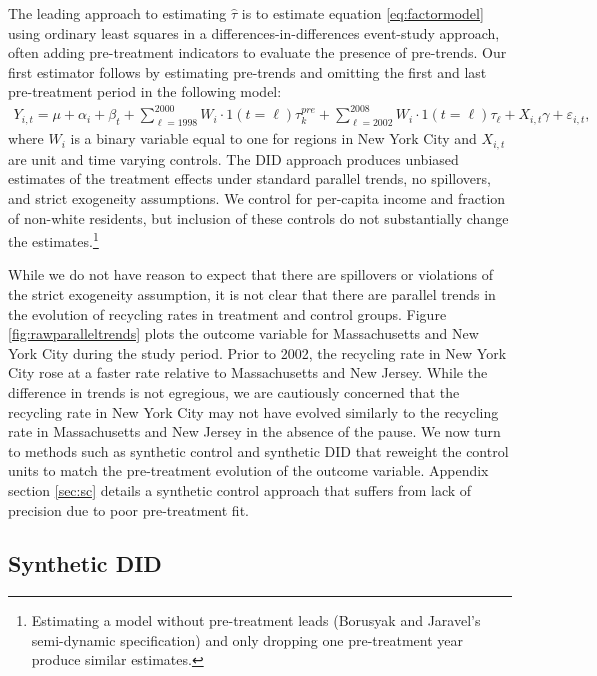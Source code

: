 \documentclass[12pt]{article}
\begin{document}
The leading approach to estimating \(\hat{\tau}\) is to estimate equation \ref{eq:factormodel} using ordinary least squares in a differences-in-differences event-study approach, often adding pre-treatment indicators to evaluate the presence of pre-trends.  Our first estimator follows \cite{borusyakjaravel2018} by estimating pre-trends and omitting the first and last pre-treatment period in the following model:
\begin{align} \label{eq:did}
    Y_{i,t} = \mu + \alpha_i + \beta_t + \sum_{\ell = 1998}^{2000} W_{i} \cdot 1(t=\ell) \tau_k^{pre} +  \sum_{\ell=2002}^{2008} W_{i} \cdot 1(t=\ell) \tau_\ell + X_{i,t}\gamma + \varepsilon_{i,t},
\end{align}
where \(W_i\) is a binary variable equal to one for regions in New York City and \(X_{i,t}\) are unit and time varying controls. The DID approach produces unbiased estimates of the treatment effects under standard parallel trends, no spillovers, and strict exogeneity assumptions. We control for per-capita income and fraction of non-white residents, but inclusion of these controls do not substantially change the estimates.\footnote{Estimating a model without pre-treatment leads (Borusyak and Jaravel's semi-dynamic specification) and only dropping one pre-treatment year produce similar estimates.}  

While we do not have reason to expect that there are spillovers or violations of the strict exogeneity assumption, it is not clear that there are parallel trends in the evolution of recycling rates in treatment and control groups.  Figure \ref{fig:rawparalleltrends} plots the outcome variable for Massachusetts and New York City during the study period.  Prior to 2002, the recycling rate in New York City rose at a faster rate relative to Massachusetts and New Jersey.  While the difference in trends is not egregious, we are cautiously concerned that the recycling rate in New York City may not have evolved similarly to the recycling rate in Massachusetts and New Jersey in the absence of the pause.  We now turn to methods such as synthetic control and synthetic DID that reweight the control units to match the pre-treatment evolution of the outcome variable.  Appendix section \ref{sec:sc} details a synthetic control approach that suffers from lack of precision due to poor pre-treatment fit.

\subsection{Synthetic DID}
\end{document}
